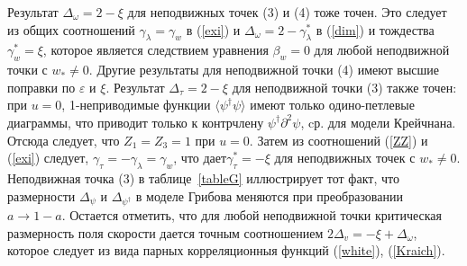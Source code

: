 \documentclass[a4paper,10pt]{article}
\begin{document}
Результат $\Delta_{\omega}=2-\xi$  для неподвижных точек (3) и (4) тоже точен. Это следует из общих соотношений  $\gamma_{\lambda}=\gamma_{w}$
 в (\ref{exi}) и $\Delta_{\omega}=2-\gamma_{\lambda}^{*}$ в (\ref{dim}) и тождества $\gamma_{w}^{*}= \xi$, которое
является следствием уравнения $\beta_{w}=0$ для любой неподвижной точки с $w_{*}\ne 0$.
Другие результаты для неподвижной точки (4) имеют высшие поправки по   $\varepsilon$ и $\xi$.
Результат $\Delta_{\tau}=2-\xi$ для неподвижной точки (3) также точен: при  $u=0$, 1-неприводимые функции $\langle \psi^{\dag} \psi \rangle$
имеют только одино-петлевые диаграммы, что приводит только к контрчлену $\psi^{\dag}\partial^{2} \psi$, cр.  \cite{JphysA} для модели Крейчнана.
Отсюда следует, что $Z_{1}=Z_{3}=1$ при $u=0$. Затем из соотношений (\ref{ZZ}) и (\ref{exi}) следует,  $\gamma_{\tau}=-\gamma_{\lambda}=\gamma_{w}$,
что дает$\gamma_{\tau}^{*}= -\xi$ для неподвижных точек с $w_{*}\ne 0$.
Неподвижная точка (3) в таблице~\ref{tableG} иллюстрирует тот факт, что размерности $\Delta_{\psi}$ и $\Delta_{\psi^{\dag}}$ в моделе Грибова меняются
при преобразовании $a\to1-a$.
Остается отметить, что для любой неподвижной точки критическая размерность поля скорости дается точным соотношением  $2\Delta_{v}=-\xi+\Delta_{\omega}$,
которое следует из вида парных корреляционныя функций (\ref{white}), (\ref{Kraich}).
\end{document}
